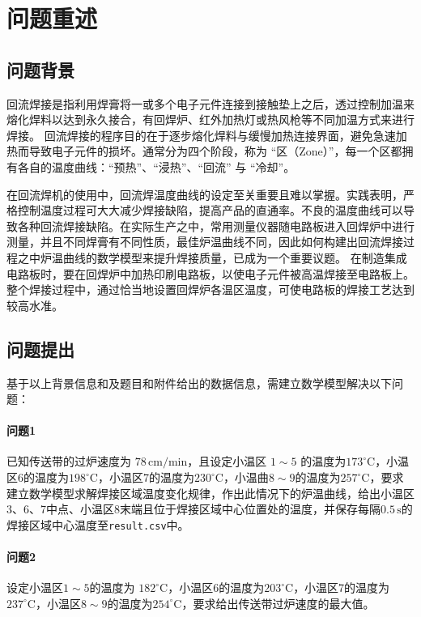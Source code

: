 \documentclass[../main.tex]{subfiles}
\begin{document}
\section{问题重述}
\subsection{问题背景}
回流焊接是指利用焊膏将一或多个电子元件连接到接触垫上之后，透过控制加温来熔化焊料以达到永久接合，有回焊炉、红外加热灯或热风枪等不同加温方式来进行焊接。
回流焊接的程序目的在于逐步熔化焊料与缓慢加热连接界面，避免急速加热而导致电子元件的损坏。通常分为四个阶段，称为 “区（Zone）”，每一个区都拥有各自的温度曲线：“预热”、“浸热”、“回流” 与 “冷却”。

在回流焊机的使用中，回流焊温度曲线的设定至关重要且难以掌握。实践表明，严格控制温度过程可大大减少焊接缺陷，提高产品的直通率。不良的温度曲线可以导致各种回流焊接缺陷。在实际生产之中，常用测量仪器随电路板进入回焊炉中进行测量，并且不同焊膏有不同性质，最佳炉温曲线不同，因此如何构建出回流焊接过程之中炉温曲线的数学模型来提升焊接质量，已成为一个重要议题。
在制造集成电路板时，要在回焊炉中加热印刷电路板，以使电子元件被高温焊接至电路板上。整个焊接过程中，通过恰当地设置回焊炉各温区温度，可使电路板的焊接工艺达到较高水准。

\subsection{问题提出} %
基于以上背景信息和及题目和附件给出的数据信息，需建立数学模型解决以下问题：

\paragraph{问题1}
已知传送带的过炉速度为 \(78\,\mathrm{cm}/\mathrm{min}\)，且设定小温区 \(1{\sim}5\) 的温度为\(173^{\circ} \mathrm{C}\)，小温区6的温度为\(198^{\circ}\mathrm{C}\)，小温区7的温度为\(230^{\circ}\mathrm{C}\)，小温曲\(8{ \sim }9\)的温度为\(257^{\circ}\mathrm{C}\)，要求建立数学模型求解焊接区域温度变化规律，作出此情况下的炉温曲线，给出小温区3、6、7中点、小温区8末端且位于焊接区域中心位置处的温度，并保存每隔\(0.5\, \mathrm{s}\)的焊接区域中心温度至\texttt{result.csv}中。

\paragraph{问题2}
设定小温区\(1{\sim}5\)的温度为 \(182^{\circ}\mathrm{C}\)，小温区6的温度为\(203^{\circ}\mathrm{C}\)，小温区7的温度为\(237^{\circ}\mathrm{C}\)，小温区\(8{\sim}9\)的温度为\(254^{\circ}\mathrm{C}\)，要求给出传送带过炉速度的最大值。
\end{document}
